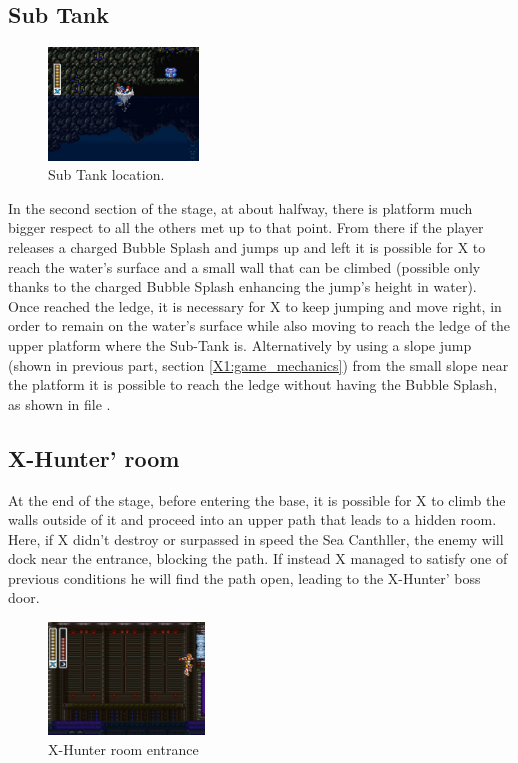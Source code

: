 \subsection{Sub Tank}
\begin{figure}[htp]
	\centering
	\includegraphics[height=3cm]{figures/X2/Bubble_crab/Crab_tank.png}
	\caption{Sub Tank location.}
\end{figure}
In the second section of the stage, at about halfway, there is platform much bigger respect to all the others met up to that point. From there if the player releases a charged Bubble Splash and jumps up and left it is possible for X to reach the water's surface and a small wall that can be climbed (possible only thanks to the charged Bubble Splash enhancing the jump's height in water). Once reached the ledge, it is necessary for X to keep jumping and move right, in order to remain on the water's surface while also moving to reach the ledge of the upper platform where the Sub-Tank is. Alternatively by using a slope jump (shown in previous part, section \ref{X1:game_mechanics}) from the small slope near the platform it is possible to reach the ledge without having the Bubble Splash, as shown in file .

\subsection{X-Hunter' room}
At the end of the stage, before entering the base, it is possible for X to climb the walls outside of it and proceed into an upper path that leads to a hidden room. Here, if X didn't destroy or surpassed in speed the Sea Canthller, the enemy will dock near the entrance, blocking the path. If instead X managed to satisfy one of previous conditions he will find the path open, leading to the X-Hunter' boss door.

\begin{figure}[htp]
	\centering
	\includegraphics[height=3cm]{figures/X2/Bubble_crab/Crab_Hunter_room.png}
	\caption{X-Hunter room entrance}
\end{figure}

